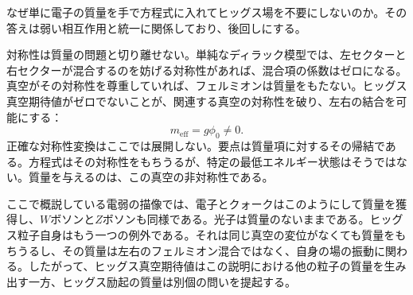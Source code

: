 なぜ単に電子の質量を手で方程式に入れてヒッグス場を不要にしないのか。その答えは弱い相互作用と統一に関係しており、後回しにする。

\begin{classroomqa}
\end{classroomqa}

\begin{classroomqa}
\end{classroomqa}

対称性は質量の問題と切り離せない。単純なディラック模型では、左セクターと右セクターが混合するのを妨げる対称性があれば、混合項の係数はゼロになる。真空がその対称性を尊重していれば、フェルミオンは質量をもたない。ヒッグス真空期待値がゼロでないことが、関連する真空の対称性を破り、左右の結合を可能にする：
\begin{equation}
m_{\mathrm{eff}}=g\phi_0\neq0.
\end{equation}
正確な対称性変換はここでは展開しない。要点は質量項に対するその帰結である。方程式はその対称性をもちうるが、特定の最低エネルギー状態はそうではない。質量を与えるのは、この真空の非対称性である。

ここで概説している電弱の描像では、電子とクォークはこのようにして質量を獲得し、\(W\)ボソンと\(Z\)ボソンも同様である。光子は質量のないままである。ヒッグス粒子自身はもう一つの例外である。それは同じ真空の変位がなくても質量をもちうるし、その質量は左右のフェルミオン混合ではなく、自身の場の振動に関わる。したがって、ヒッグス真空期待値はこの説明における他の粒子の質量を生み出す一方、ヒッグス励起の質量は別個の問いを提起する。

\begin{classroomqa}
\end{classroomqa}

